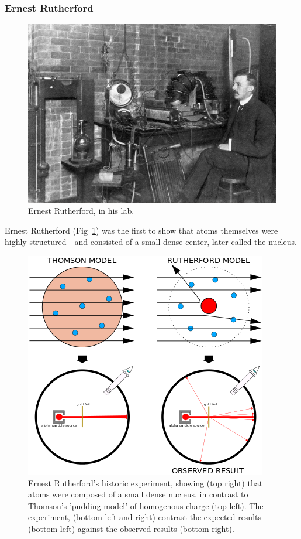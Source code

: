 \subsubsection{Ernest Rutherford}

\begin{figure}[ht]
	\centering
	\includegraphics[width=0.6\linewidth]{../Chapter2/fig/ernestrutherford.jpg}
	\caption{Ernest Rutherford, in his lab.}
	\label{fig:rutherford}
\end{figure}

Ernest Rutherford (Fig~\ref{fig:rutherford}) was the first to show that atoms
themselves were highly structured - and consisted of a small dense center, later
called the nucleus.

\begin{figure}[ht]
	\centering
	\includegraphics[width=0.6\linewidth]{../Chapter2/fig/geiger_marsden.png}
	\caption{
		Ernest Rutherford's historic experiment, showing (top right) that atoms were
		composed of a small dense nucleus, in contrast to Thomson's 'pudding model'
		of homogenous charge (top left). The experiment, (bottom left and right)
		contrast the expected results (bottom left) against the observed results
		(bottom right).
	}
	\label{fig:geigermarsden}
\end{figure}

